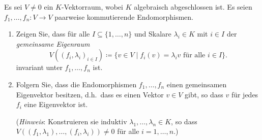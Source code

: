 \begin{question}
  Es sei $V \neq 0$ ein $K$-Vektorraum, wobei $K$ algebraisch abgeschlossen ist.
  Es seien $f_1, \dotsc, f_n \colon V \to V$ paarweise kommutierende Endomorphismen.
  \begin{enumerate}[leftmargin=*]
    \item
      Zeigen Sie, dass für alle $I \subseteq \{1, \dotsc, n\}$ und Skalare $\lambda_i \in K$ mit $i \in I$ der \emph{gemeinsame Eigenraum}
      \[
                   V( (f_i, \lambda_i)_{i \in I} )
        \coloneqq  \{ v \in V \mid \text{$f_i(v) = \lambda_i v$ für alle $i \in I$} \}.
      \]
      invariant unter $f_1, \dotsc, f_n$ ist.
     \item
      Folgern Sie, dass die Endomorphismen $f_1, \dotsc, f_n$ einen gemeinsamen Eigenvektor besitzen, d.h.\ dass es einen Vektor $v \in V$ gibt, so dass $v$ für jedes $f_i$ eine Eigenvektor ist.
      
      (\emph{Hinweis}: Konstruieren sie induktiv $\lambda_1, \dotsc, \lambda_n \in K$, so dass $V((f_1, \lambda_1), \dotsc, (f_i, \lambda_i)) \neq 0$ für alle $i = 1, \dotsc, n$.)
  \end{enumerate}
\end{question}



